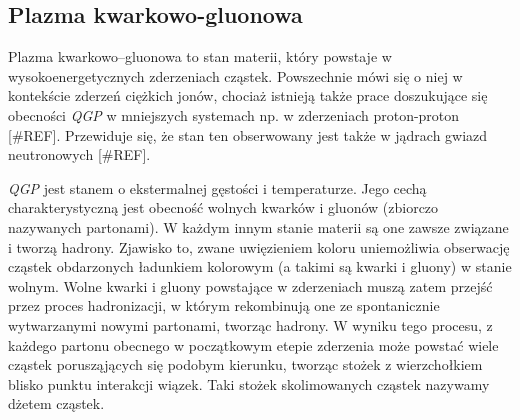 \subsection{Plazma kwarkowo-gluonowa}
\label{subsec:qgp}

Plazma kwarkowo--gluonowa  to stan materii, który powstaje w wysokoenergetycznych zderzeniach cząstek. Powszechnie mówi się o niej w kontekście zderzeń ciężkich jonów, chociaż istnieją także prace doszukujące się obecności \textit{QGP} w mniejszych systemach np. w zderzeniach proton-proton [\#REF]. Przewiduje się, że stan ten obserwowany jest także w jądrach gwiazd neutronowych [\#REF].

\textit{QGP} jest stanem o ekstermalnej gęstości i temperaturze. Jego cechą charakterystyczną jest obecność wolnych kwarków i gluonów (zbiorczo nazywanych partonami). 
W każdym innym stanie materii są one zawsze związane i tworzą hadrony. Zjawisko to, zwane uwięzieniem koloru  uniemożliwia obserwację cząstek obdarzonych ładunkiem kolorowym (a takimi są kwarki i gluony) w stanie wolnym.
Wolne kwarki i gluony powstające w zderzeniach muszą zatem przejść przez proces hadronizacji, w którym  rekombinują one ze spontanicznie wytwarzanymi nowymi partonami, tworząc hadrony. W wyniku tego procesu, z każdego partonu obecnego w początkowym etepie zderzenia może powstać wiele cząstek porusząjących się podobym kierunku, tworząc stożek z wierzchołkiem blisko punktu interakcji wiązek. Taki stożek skolimowanych cząstek nazywamy dżetem cząstek.




